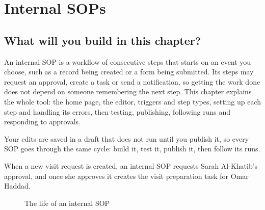 \chapter{Internal SOPs}
\label{ch:builder-internal-sops}

\section{What will you build in this chapter?}
\label{sec:builder-internal-sops-intro}

An internal SOP is a workflow of consecutive steps that starts on an event you choose, such as a record being created or a form being submitted. Its steps may request an approval, create a task or send a notification, so getting the work done does not depend on someone remembering the next step. This chapter explains the whole tool: the home page, the editor, triggers and step types, setting up each step and handling its errors, then testing, publishing, following runs and responding to approvals.

Your edits are saved in a draft that does not run until you publish it, so every SOP goes through the same cycle: build it, test it, publish it, then follow its runs.

\begin{rcnote}
When a new visit request is created, an internal SOP requests Sarah Al-Khatib's approval, and once she approves it creates the visit preparation task for Omar Haddad.
\end{rcnote}

\begin{figure}[H]
\centering
{}
\rclegend
\caption{The life of an internal SOP}
\label{fig:builder-internal-sops-overview}
\end{figure}

